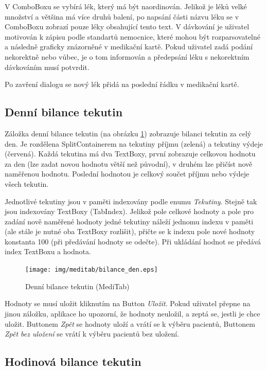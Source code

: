 V ComboBoxu se vybírá lék, který má být naordinován. Jelikož je léků velké množství a většina má více druhů balení, po napsání části názvu léku se v ComboBoxu zobrazí pouze léky obsahující tento text. V dávkování je uživatel motivován k zápisu podle standartů nemocnice, které mohou být rozparsovatelné a následně graficky znázorněné v medikační kartě. Pokud uživatel zadá podání nekorektně nebo vůbec, je o tom informován a předepsání léku s nekorektním dávkováním musí potvrdit.

Po zavření dialogu se nový lék přidá na poslední řádku v medikační kartě.


\subsection{Denní bilance tekutin}

Záložka denní bilance tekutin (na obrázku \ref{fig:bilance_den}) zobrazuje bilanci tekutin za celý den. Je rozdělena SplitContainerem na tekutiny příjmu (zelená) a tekutiny výdeje (červená). Každá tekutina má dva TextBoxy, první zobrazuje celkovou hodnotu za den (lze zadat novou hodnotu větší než původní), v druhém lze přičíst nově naměřenou hodnotu. Poslední hodnotou je celkový součet příjmu nebo výdeje všech tekutin.

Jednotlivé tekutiny jsou v paměti indexovány podle enumu \emph{Tekutiny}. Stejně tak jsou indexovány TextBoxy (TabIndex). Jelikož pole celkové hodnoty a pole pro zadání nově naměřené hodnoty jedné tekutiny náleží jednomu indexu v paměti (ale stále je nutné oba TextBoxy rozlišit), přičte se k indexu pole nové hodnoty konstanta 100 (při předávání hodnoty se odečte). Při ukládání hodnot se předává index TextBoxu a hodnota.

\begin{figure}[H]
	\centering
	\texttt{[image: img/meditab/bilance\_den.eps]}
	\caption{Denní bilance tekutin (MediTab)}
  \label{fig:bilance_den}
\end{figure}

Hodnoty se musí uložit kliknutím na Button \emph{Uložit}. Pokud uživatel přepne na jinou záložku, aplikace ho upozorní, že hodnoty neuložil, a zeptá se, jestli je chce uložit. Buttonem \emph{Zpět} se hodnoty uloží a vrátí se k výběru pacientů, Buttonem \emph{Zpět bez uložení} se vrátí k výběru pacientů bez uložení.

\subsection{Hodinová bilance tekutin}

